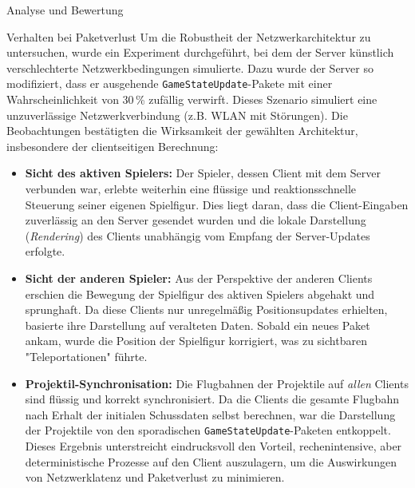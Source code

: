 \begin{section}{Analyse und Bewertung}
\begin{subsection}{Verhalten bei Paketverlust}
Um die Robustheit der Netzwerkarchitektur zu untersuchen, wurde ein Experiment durchgeführt, bei dem der Server künstlich verschlechterte Netzwerkbedingungen simulierte.
Dazu wurde der Server so modifiziert, dass er ausgehende \texttt{GameStateUpdate}-Pakete mit einer Wahrscheinlichkeit von 30\,\% zufällig verwirft.
Dieses Szenario simuliert eine unzuverlässige Netzwerkverbindung (z.B. WLAN mit Störungen).
Die Beobachtungen bestätigten die Wirksamkeit der gewählten Architektur, insbesondere der clientseitigen Berechnung:
\begin{itemize}
    \item \textbf{Sicht des aktiven Spielers:} Der Spieler, dessen Client mit dem Server verbunden war, erlebte weiterhin eine flüssige und reaktionsschnelle Steuerung seiner eigenen Spielfigur.
Dies liegt daran, dass die Client-Eingaben zuverlässig an den Server gesendet wurden und die lokale Darstellung (\emph{Rendering}) des Clients unabhängig vom Empfang der Server-Updates erfolgte.
\item \textbf{Sicht der anderen Spieler:} Aus der Perspektive der anderen Clients erschien die Bewegung der Spielfigur des aktiven Spielers abgehakt und sprunghaft.
Da diese Clients nur unregelmäßig Positionsupdates erhielten, basierte ihre Darstellung auf veralteten Daten.
Sobald ein neues Paket ankam, wurde die Position der Spielfigur korrigiert, was zu sichtbaren "Teleportationen" führte.
\item \textbf{Projektil-Synchronisation:} Die Flugbahnen der Projektile auf \emph{allen} Clients sind flüssig und korrekt synchronisiert.
Da die Clients die gesamte Flugbahn nach Erhalt der initialen Schussdaten selbst berechnen, war die Darstellung der Projektile von den sporadischen \texttt{GameStateUpdate}-Paketen entkoppelt.
Dieses Ergebnis unterstreicht eindrucksvoll den Vorteil, rechenintensive, aber deterministische Prozesse auf den Client auszulagern, um die Auswirkungen von Netzwerklatenz und Paketverlust zu minimieren.
\end{itemize}

\end{subsection}


\end{section}
